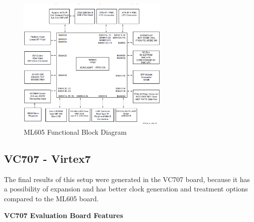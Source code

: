 \begin{figure}[htbp]
    \centering
    \includegraphics[width=0.65\textwidth]{./figures/ml605_bd}
    \caption{ ML605 Functional Block Diagram
    \label{fig:ml605bd}}
\end{figure}

\subsection{VC707 - Virtex7}

The final results of this setup were generated in the VC707 board, because it
has a possibility of expansion and has better clock generation and treatment
options compared to the ML605 board.

\textbf{VC707 Evaluation Board Features}

